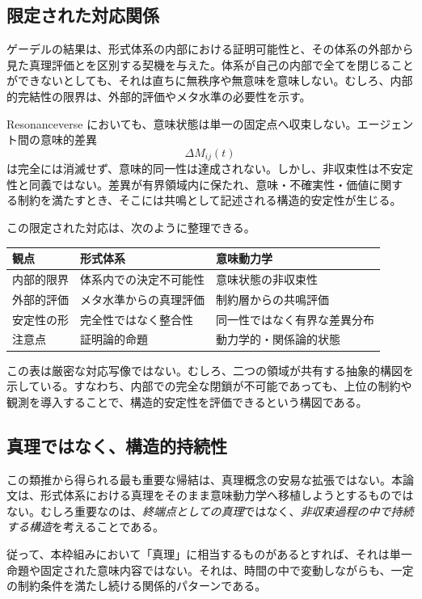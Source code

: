\documentclass[11pt,a4paper]{article}
\theoremstyle{definition}
\begin{document}
\subsection{限定された対応関係}

ゲーデルの結果は、形式体系の内部における証明可能性と、その体系の外部から見た真理評価とを区別する契機を与えた。体系が自己の内部で全てを閉じることができないとしても、それは直ちに無秩序や無意味を意味しない。むしろ、内部的完結性の限界は、外部的評価やメタ水準の必要性を示す。

Resonanceverse においても、意味状態は単一の固定点へ収束しない。エージェント間の意味的差異
\[
\Delta M_{ij}(t)
\]
は完全には消滅せず、意味的同一性は達成されない。しかし、非収束性は不安定性と同義ではない。差異が有界領域内に保たれ、意味・不確実性・価値に関する制約を満たすとき、そこには共鳴として記述される構造的安定性が生じる。

この限定された対応は、次のように整理できる。

\begin{table}[h]
\centering
\begin{tabular}{lll}
\hline
\textbf{観点} & \textbf{形式体系} & \textbf{意味動力学} \\
\hline
内部的限界 & 体系内での決定不可能性 & 意味状態の非収束性 \\
外部的評価 & メタ水準からの真理評価 & 制約層からの共鳴評価 \\
安定性の形 & 完全性ではなく整合性 & 同一性ではなく有界な差異分布 \\
注意点 & 証明論的命題 & 動力学的・関係論的状態 \\
\hline
\end{tabular}
\end{table}

この表は厳密な対応写像ではない。むしろ、二つの領域が共有する抽象的構図を示している。すなわち、内部での完全な閉鎖が不可能であっても、上位の制約や観測を導入することで、構造的安定性を評価できるという構図である。

\subsection{真理ではなく、構造的持続性}

この類推から得られる最も重要な帰結は、真理概念の安易な拡張ではない。本論文は、形式体系における真理をそのまま意味動力学へ移植しようとするものではない。むしろ重要なのは、\textit{終端点としての真理}ではなく、\textit{非収束過程の中で持続する構造}を考えることである。

従って、本枠組みにおいて「真理」に相当するものがあるとすれば、それは単一命題や固定された意味内容ではない。それは、時間の中で変動しながらも、一定の制約条件を満たし続ける関係的パターンである。
\end{document}
